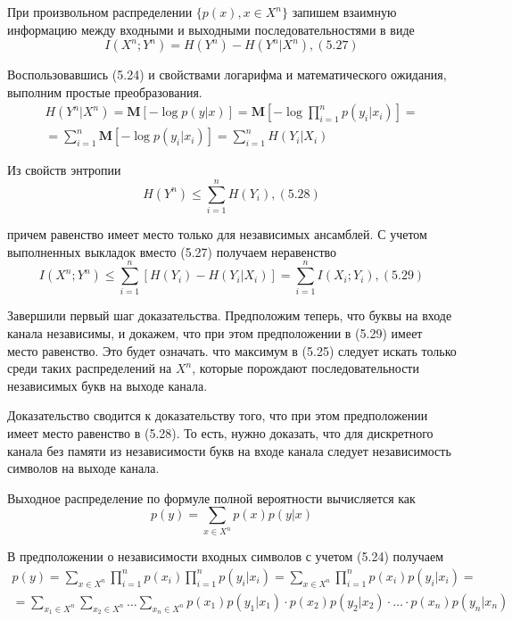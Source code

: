 \documentclass[14pt]{article}
\begin{document}
При произвольном распределении \(\{p(x), x \in X^n\}\) запишем взаимную
информацию между входными и выходными последовательностями в
виде
\begin{displaymath}
    I(X^n;Y^n) = H(Y^n) - H(Y^n|X^n), (5.27)
\end{displaymath}

Воспользовавшись (5.24) и свойствами логарифма и
математического ожидания, выполним простые преобразования.
\begin{displaymath}
    \begin{aligned}
    H(Y^n|X^n) = \textbf{M}[-\log p(y|x)] = \textbf{M} \left[-\log \prod_{i=1}^{n} p(y_i|x_i) \right] = \\
        = \sum_{i=1}^{n} \textbf{M}[-\log p(y_i|x_i)] = \sum_{i=1}^{n} H(Y_i|X_i)
    \end{aligned}
\end{displaymath}

Из свойств энтропии
\begin{displaymath}
    H(Y^n) \leq \sum_{i=1}^{n} H(Y_i), (5.28)
\end{displaymath}

причем равенство имеет место только для независимых ансамблей.
С учетом выполненных выкладок вместо (5.27) получаем неравенство
\begin{displaymath}
    I(X^n;Y^n) \leq \sum_{i=1}^{n}[H(Y_i) - H(Y_i|X_i)] = \sum_{i=1}^{n} I(X_i;Y_i), (5.29)
\end{displaymath}

Завершили первый шаг доказательства. Предположим теперь, что
буквы на входе канала независимы, и докажем, что при этом
предположении в (5.29) имеет место равенство. Это будет означать.
что максимум в (5.25) следует искать только среди таких
распределений на \(X^n\), которые порождают последовательности
независимых букв на выходе канала.

Доказательство сводится к доказательству того, что при этом
предположении имеет место равенство в (5.28). То есть, нужно
доказать, что для дискретного канала без памяти из независимости
букв на входе канала следует независимость символов на выходе
канала.

Выходное распределение по формуле полной вероятности
вычисляется как
\begin{displaymath}
    p(y) = \sum_{x \in X^n} p(x)p(y|x)
\end{displaymath}

В предположении о независимости входных символов с учетом
(5.24) получаем
\begin{displaymath}
    \begin{aligned}
    p(y) = \sum_{x \in X^n} \prod_{i=1}^{n} p(x_i) \prod_{i=1}^{n} p(y_i|x_i) = \sum_{x \in X^n} \prod_{i=1}^{n} p(x_i)p(y_i|x_i) = \\
        = \sum_{x_1 \in X^n} \sum_{x_2 \in X^n} \ldots \sum_{x_n \in X^n} p(x_1)p(y_1|x_1) \cdot p(x_2)p(y_2|x_2) \cdot \ldots \cdot p(x_n)p(y_n|x_n) \\
    \end{aligned}
\end{displaymath}
\end{document}
